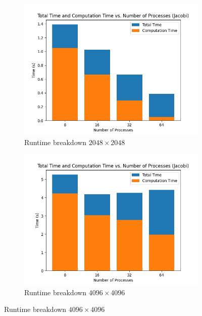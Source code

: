 \documentclass{article}
\begin{document}
\begin{figure}[ht]
    \centering
    \begin{subfigure}{0.45\textwidth}
        \includegraphics[width=\textwidth]{a5/plots/bar-chart-Jacobi-small.png}
        \caption{Runtime breakdown $2048 \times 2048$}
        \label{fig:jacobi2048time}
    \end{subfigure}
    \begin{subfigure}{0.45\textwidth}
        \includegraphics[width=\textwidth]{a5/plots/bar-chart-Jacobi-medium.png}
        \caption{Runtime breakdown $4096 \times 4096$}
        \label{fig:jacobi4096time}
    \end{subfigure}
    \vspace{1em}

\end{figure}
\end{document}
